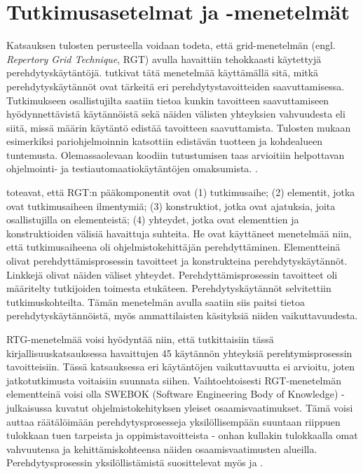 \documentclass[utf8]{gradu3}
\begin{document}
\section{Tutkimusasetelmat ja -menetelmät}

Katsauksen tulosten perusteella voidaan todeta, että grid-menetelmän (engl. \textit{Repertory Grid Technique}, RGT) avulla havaittiin tehokkaasti käytettyjä perehdytyskäytäntöjä. \textcite{buchan-ym-2019} tutkivat tätä menetelmää käyttämällä sitä, mitkä perehdytyskäytännöt ovat tärkeitä eri perehdytystavoitteiden saavuttamisessa. Tutkimukseen osallistujilta saatiin tietoa kunkin tavoitteen saavuttamiseen hyödynnettävistä käytännöistä sekä näiden välisten yhteyksien vahvuudesta eli siitä, missä määrin käytäntö edistää tavoitteen saavuttamista. Tulosten mukaan esimerkiksi pariohjelmoinnin katsottiin edistävän tuotteen ja kohdealueen tuntemusta. Olemassaolevaan koodiin tutustumisen taas arvioitiin helpottavan ohjelmointi- ja testiautomaatiokäytäntöjen omaksumista. \parencite{buchan-ym-2019}.

\textcite{buchan-ym-2019} toteavat, että RGT:n pääkomponentit ovat (1) tutkimusaihe; (2) elementit, jotka ovat tutkimusaiheen ilmentymiä; (3) konstruktiot, jotka ovat ajatuksia, joita osallistujilla on elementeistä; (4) yhteydet, jotka ovat elementtien ja konstruktioiden välisiä havaittuja suhteita. He ovat  käyttäneet menetelmää niin, että tutkimusaiheena oli ohjelmistokehittäjän perehdyttäminen. Elementteinä olivat perehdyttämisprosessin tavoitteet ja konstrukteina perehdytyskäytännöt. Linkkejä olivat näiden väliset yhteydet. Perehdyttämisprosessin tavoitteet oli määritelty tutkijoiden toimesta etukäteen. Perehdytyskäytännöt selvitettiin tutkimuskohteilta. Tämän menetelmän avulla saatiin siis paitsi tietoa perehdytyskäytännöistä, myös ammattilaisten käsityksiä niiden vaikuttavuudesta. 

RTG-menetelmää voisi hyödyntää niin, että tutkittaisiin tässä kirjallisuuskatsauksessa havaittujen 45 käytännön yhteyksiä perehtymisprosessin tavoitteisiin. Tässä katsauksessa eri käytäntöjen vaikuttavuutta ei arvioitu, joten jatkotutkimusta voitaisiin suunnata siihen. Vaihtoehtoisesti RGT-menetelmän elementteinä voisi olla SWEBOK (Software Engineering Body of Knowledge) -julkaisussa \parencite{swebok} kuvatut ohjelmistokehityksen yleiset osaamisvaatimukset. Tämä voisi auttaa räätälöimään perehdytysprosesseja yksilöllisempään suuntaan riippuen tulokkaan tuen tarpeista ja oppimistavoitteista - onhan kullakin tulokkaalla omat vahvuutensa ja kehittämiskohteensa näiden osaamisvaatimusten alueilla. Perehdytysprosessin yksilöllistämistä suosittelevat myös \textcite{britto-ym-2017} ja \textcite{rodeghero-ym-2021}.
\end{document}
